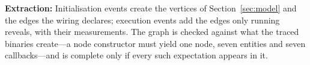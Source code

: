 \textbf{Extraction:} Initialisation events create the vertices of Section~\ref{sec:model} and the edges the wiring declares; execution events add the edges only running reveals, with their measurements. The graph is checked against what the traced binaries create---a node constructor must yield one node, seven entities and seven callbacks---and is complete only if every such expectation appears in it.
